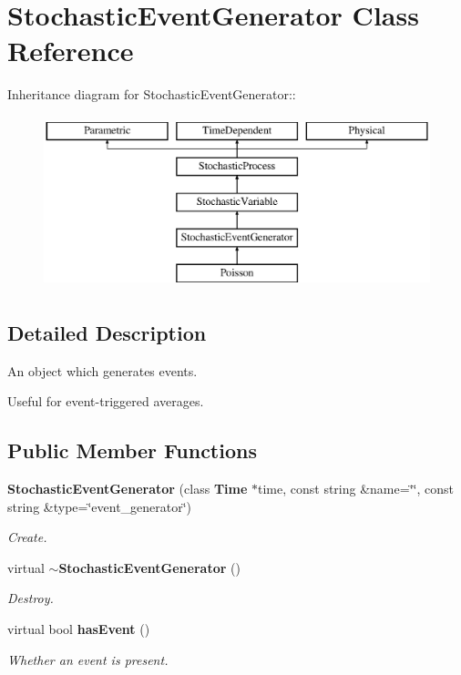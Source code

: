 \section{StochasticEventGenerator Class Reference}
\label{classStochasticEventGenerator}
Inheritance diagram for StochasticEventGenerator::\begin{figure}[H]
\begin{center}
\leavevmode
\includegraphics[height=5cm]{classStochasticEventGenerator}
\end{center}
\end{figure}


\subsection{Detailed Description}
An object which generates events. 

Useful for event-triggered averages. \subsection*{Public Member Functions}
\begin{CompactItemize}
\item 
{\bf StochasticEventGenerator} (class {\bf Time} $\ast$time, const string \&name=\char`\"{}\char`\"{}, const string \&type=\char`\"{}event\_\-generator\char`\"{})\label{classStochasticEventGenerator_f113f0914087df33485ec999204037c6}

\begin{CompactList}\small\item\em Create. \item\end{CompactList}\item 
virtual {\bf $\sim$StochasticEventGenerator} ()\label{classStochasticEventGenerator_fd363097980a3d600520e934b9fdfb1c}

\begin{CompactList}\small\item\em Destroy. \item\end{CompactList}\item 
virtual bool {\bf hasEvent} ()\label{classStochasticEventGenerator_25b18204e3b8f826ed0b0b5b9a4c755a}

\begin{CompactList}\small\item\em Whether an event is present. \item\end{CompactList}\end{CompactItemize}
